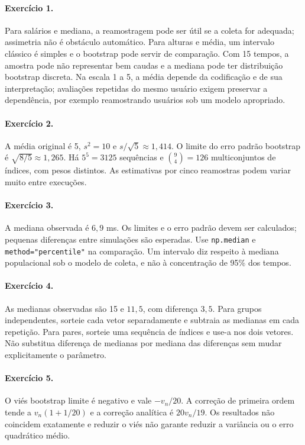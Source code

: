 \documentclass[12pt,a4paper]{article}
\begin{document}
\paragraph{Exercício 1.} Para salários e mediana, a reamostragem pode ser útil se a coleta for adequada; assimetria não é obstáculo automático. Para alturas e média, um intervalo clássico é simples e o bootstrap pode servir de comparação. Com 15 tempos, a amostra pode não representar bem caudas e a mediana pode ter distribuição bootstrap discreta. Na escala 1 a 5, a média depende da codificação e de sua interpretação; avaliações repetidas do mesmo usuário exigem preservar a dependência, por exemplo reamostrando usuários sob um modelo apropriado.

\paragraph{Exercício 2.} A média original é 5, $s^2=10$ e $s/\sqrt5\approx1{,}414$. O limite do erro padrão bootstrap é $\sqrt{8/5}\approx1{,}265$. Há $5^5=3125$ sequências e $\binom94=126$ multiconjuntos de índices, com pesos distintos. As estimativas por cinco reamostras podem variar muito entre execuções.

\paragraph{Exercício 3.} A mediana observada é $6{,}9$ ms. Os limites e o erro padrão devem ser calculados; pequenas diferenças entre simulações são esperadas. Use \texttt{np.median} e \texttt{method="percentile"} na comparação. Um intervalo diz respeito à mediana populacional sob o modelo de coleta, e não à concentração de 95\% dos tempos.

\paragraph{Exercício 4.} As medianas observadas são 15 e $11{,}5$, com diferença $3{,}5$. Para grupos independentes, sorteie cada vetor separadamente e subtraia as medianas em cada repetição. Para pares, sorteie uma sequência de índices e use-a nos dois vetores. Não substitua diferença de medianas por mediana das diferenças sem mudar explicitamente o parâmetro.

\paragraph{Exercício 5.} O viés bootstrap limite é negativo e vale $-v_n/20$. A correção de primeira ordem tende a $v_n(1+1/20)$ e a correção analítica é $20v_n/19$. Os resultados não coincidem exatamente e reduzir o viés não garante reduzir a variância ou o erro quadrático médio.
\end{document}
